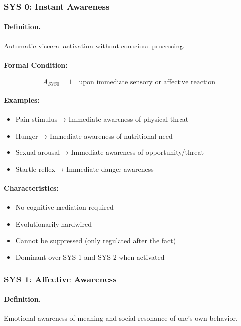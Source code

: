 \subsubsection{SYS 0: Instant Awareness}

\paragraph{Definition.}
Automatic visceral activation without conscious processing.

\paragraph{Formal Condition:}
\begin{equation}
A_{SYS0} = 1 \quad \text{upon immediate sensory or affective reaction}
\end{equation}

\paragraph{Examples:}
\begin{itemize}
\item Pain stimulus → Immediate awareness of physical threat
\item Hunger → Immediate awareness of nutritional need
\item Sexual arousal → Immediate awareness of opportunity/threat
\item Startle reflex → Immediate danger awareness
\end{itemize}

\paragraph{Characteristics:}
\begin{itemize}
\item No cognitive mediation required
\item Evolutionarily hardwired
\item Cannot be suppressed (only regulated after the fact)
\item Dominant over SYS 1 and SYS 2 when activated
\end{itemize}

\subsubsection{SYS 1: Affective Awareness}

\paragraph{Definition.}
Emotional awareness of meaning and social resonance of one's own behavior.

